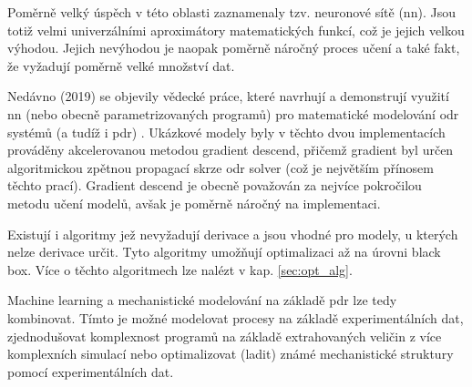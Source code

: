 Poměrně velký úspěch v této oblasti zaznamenaly tzv. neuronové sítě
(\acrshort{nn}). Jsou totiž velmi univerzálními aproximátory matematických
funkcí, což je jejich velkou výhodou. Jejich nevýhodou je naopak poměrně
náročný proces učení a také fakt, že vyžadují poměrně velké množství dat.

Nedávno (2019) se objevily vědecké práce, které navrhují a demonstrují využití
\acrshort{nn} (nebo obecně parametrizovaných programů) pro matematické
modelování \acrshort{odr} systémů (a tudíž i \acrshort{pdr})
\cite{diffEqFlux2019,chen2018neural}. Ukázkové modely byly v těchto dvou
implementacích prováděny akcelerovanou metodou gradient descend, přičemž
gradient byl určen algoritmickou zpětnou propagací skrze \acrshort{odr} solver
(což je největším přínosem těchto prací). Gradient descend je obecně považován
za nejvíce pokročilou metodu učení modelů, avšak je poměrně náročný na
implementaci.

Existují i algoritmy jež nevyžadují derivace a jsou vhodné pro modely, u
kterých nelze derivace určit. Tyto algoritmy umožňují optimalizaci až na úrovni
black box. Více o těchto algoritmech lze nalézt v kap. \ref{sec:opt_alg}.

Machine learning a mechanistické modelování na základě \acrshort{pdr} lze tedy kombinovat.
Tímto je možné modelovat procesy na základě experimentálních dat, zjednodušovat
komplexnost programů na základě extrahovaných veličin z více komplexních
simulací nebo optimalizovat (ladit) známé mechanistické struktury pomocí
experimentálních dat.

